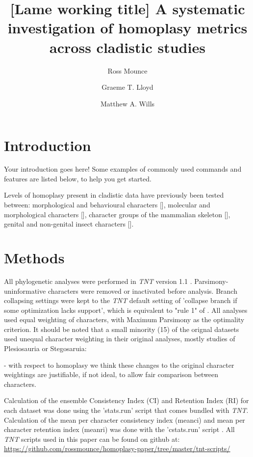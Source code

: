 \documentclass[fleqn,10pt]{wlpeerj}
\title{[Lame working title] A systematic investigation of homoplasy metrics across cladistic studies}
\author[1]{Ross Mounce}
\author[2]{Graeme T. Lloyd}
\author[1]{Matthew A. Wills}
\affil[1]{University of Bath, UK}
\affil[2]{Macquarie University, Australia}
\begin{document}
\flushbottom
\maketitle
\thispagestyle{empty}


\section{Introduction}

Your introduction goes here! Some examples of commonly used commands  and features are listed below, to help you get started. 

Levels of homoplasy present in cladistic data have previously been tested between: morphological and behavioural characters [\cite{Queiroz1993}], molecular and morphological characters [\cite{Sanderson1989}], character groups of the mammalian skeleton [\cite{Sanchez-Villagra1998}], genital and non-genital insect characters [\cite{Song2010}].  

\section{Methods}
\label{sec:examples}

All phylogenetic analyses were performed in \emph{TNT} version 1.1 \cite{Goloboff2008}. Parsimony-uninformative characters were removed or inactivated before analysis. Branch collapsing settings were kept to the \emph{TNT} default setting of 'collapse branch if some optimization lacks support', which is equivalent to "rule 1" of \cite{Coddington1994}. All analyses used equal weighting of characters, with Maximum Parsimony as the optimality criterion. It should be noted that a small minority (15) of the orignal datasets used unequal character weighting in their original analyses, mostly studies of Plesiosauria or Stegosaruia:

\cite{Alvarez1998,Angielczyk2007,Angielczyk2010,Benson2011,Benson2014,Druckenmiller2012,Druckenmiller2008,Druckenmiller2009,Ketchum2010,Ketchum2011,Korn1997,Maidment2010,Maidment2008,Mateus2009,Sundberg2004} - with respect to homoplasy we think these changes to the original character weightings are justifiable, if not ideal, to allow fair comparison between characters.

Calculation of the ensemble Consistency Index (CI) and Retention Index (RI) for each dataset was done using the 'stats.run' script that comes bundled with \emph{TNT}. Calculation of the mean per character consistency index (meanci) and mean per character retention index (meanri) was done with the 'cstats.run' script \cite{Ramirez2012}. All \emph{TNT} scripts used in this paper can be found on github at: \url{https://github.com/rossmounce/homoplasy-paper/tree/master/tnt-scripts/}
\end{document}
